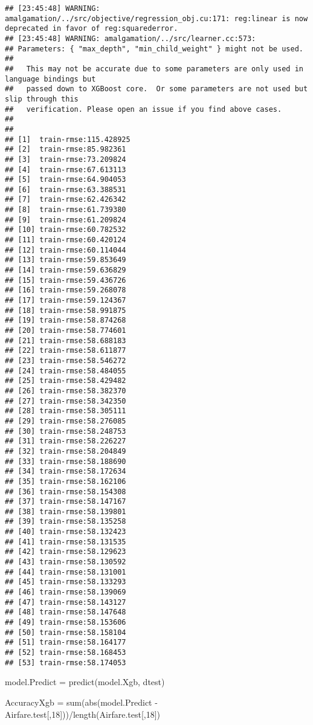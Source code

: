 \documentclass[]{article}
\newenvironment{Shaded}{\begin{snugshade}}{\end{snugshade}}
\newcommand{\DecValTok}[1]{\textcolor[rgb]{0.00,0.00,0.81}{#1}}
\newcommand{\FunctionTok}[1]{\textcolor[rgb]{0.00,0.00,0.00}{#1}}
\newcommand{\NormalTok}[1]{#1}
\newcommand{\OtherTok}[1]{\textcolor[rgb]{0.56,0.35,0.01}{#1}}
\newcommand{\SpecialCharTok}[1]{\textcolor[rgb]{0.00,0.00,0.00}{#1}}
\begin{document}
\begin{verbatim}
## [23:45:48] WARNING: amalgamation/../src/objective/regression_obj.cu:171: reg:linear is now deprecated in favor of reg:squarederror.
## [23:45:48] WARNING: amalgamation/../src/learner.cc:573: 
## Parameters: { "max_depth", "min_child_weight" } might not be used.
## 
##   This may not be accurate due to some parameters are only used in language bindings but
##   passed down to XGBoost core.  Or some parameters are not used but slip through this
##   verification. Please open an issue if you find above cases.
## 
## 
## [1]  train-rmse:115.428925 
## [2]  train-rmse:85.982361 
## [3]  train-rmse:73.209824 
## [4]  train-rmse:67.613113 
## [5]  train-rmse:64.904053 
## [6]  train-rmse:63.388531 
## [7]  train-rmse:62.426342 
## [8]  train-rmse:61.739380 
## [9]  train-rmse:61.209824 
## [10] train-rmse:60.782532 
## [11] train-rmse:60.420124 
## [12] train-rmse:60.114044 
## [13] train-rmse:59.853649 
## [14] train-rmse:59.636829 
## [15] train-rmse:59.436726 
## [16] train-rmse:59.268078 
## [17] train-rmse:59.124367 
## [18] train-rmse:58.991875 
## [19] train-rmse:58.874268 
## [20] train-rmse:58.774601 
## [21] train-rmse:58.688183 
## [22] train-rmse:58.611877 
## [23] train-rmse:58.546272 
## [24] train-rmse:58.484055 
## [25] train-rmse:58.429482 
## [26] train-rmse:58.382370 
## [27] train-rmse:58.342350 
## [28] train-rmse:58.305111 
## [29] train-rmse:58.276085 
## [30] train-rmse:58.248753 
## [31] train-rmse:58.226227 
## [32] train-rmse:58.204849 
## [33] train-rmse:58.188690 
## [34] train-rmse:58.172634 
## [35] train-rmse:58.162106 
## [36] train-rmse:58.154308 
## [37] train-rmse:58.147167 
## [38] train-rmse:58.139801 
## [39] train-rmse:58.135258 
## [40] train-rmse:58.132423 
## [41] train-rmse:58.131535 
## [42] train-rmse:58.129623 
## [43] train-rmse:58.130592 
## [44] train-rmse:58.131001 
## [45] train-rmse:58.133293 
## [46] train-rmse:58.139069 
## [47] train-rmse:58.143127 
## [48] train-rmse:58.147648 
## [49] train-rmse:58.153606 
## [50] train-rmse:58.158104 
## [51] train-rmse:58.164177 
## [52] train-rmse:58.168453 
## [53] train-rmse:58.174053
\end{verbatim}

\begin{Shaded}
\begin{Highlighting}[]
\NormalTok{model.Predict }\OtherTok{=} \FunctionTok{predict}\NormalTok{(model.Xgb, dtest)}

\NormalTok{AccuracyXgb }\OtherTok{=} \FunctionTok{sum}\NormalTok{(}\FunctionTok{abs}\NormalTok{(model.Predict }\SpecialCharTok{{-}}\NormalTok{ Airfare.test[,}\DecValTok{18}\NormalTok{]))}\SpecialCharTok{/}\FunctionTok{length}\NormalTok{(Airfare.test[,}\DecValTok{18}\NormalTok{]) }
\end{Highlighting}
\end{Shaded}
\end{document}
